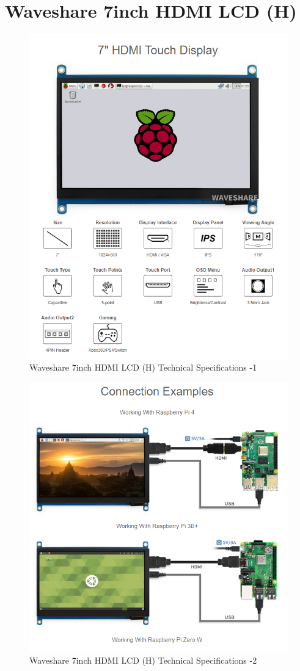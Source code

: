 \section{Waveshare 7inch HDMI LCD (H)}

\begin{figure}[H]
    \centering
    \includegraphics[width=0.85\linewidth]{texs/appendix/data/techspecs/screen1.png}
    \caption{Waveshare 7inch HDMI LCD (H) Technical Specifications -1 }
    \label{fig:lcd-1}
\end{figure}

\begin{figure}[H]
    \centering
    \includegraphics[width=0.85\linewidth]{texs/appendix/data/techspecs/screen2.png}
    \caption{Waveshare 7inch HDMI LCD (H) Technical Specifications -2 }
    \label{fig:lcd-2}
\end{figure}

